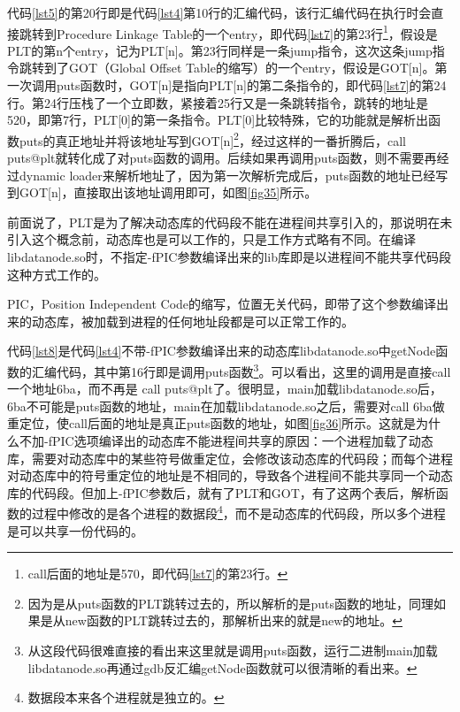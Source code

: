 \documentclass[a4paper, 12pt, titlepage]{article}
\newlength{\du}
\begin{document}
代码\ref{lst5}的第20行即是代码\ref{lst4}第10行的汇编代码，该行汇编代码在执行时会直接跳转到Procedure Linkage Table的一个entry，即代码\ref{lst7}的第23行\footnote{call后面的地址是570，即代码\ref{lst7}的第23行。}，假设是PLT的第n个entry，记为PLT[n]。第23行同样是一条jump指令，这次这条jump指令跳转到了GOT（Global Offset Table的缩写）的一个entry，假设是GOT[n]。第一次调用puts函数时，GOT[n]是指向PLT[n]的第二条指令的，即代码\ref{lst7}的第24行。第24行压栈了一个立即数，紧接着25行又是一条跳转指令，跳转的地址是520，即第7行，PLT[0]的第一条指令。PLT[0]比较特殊，它的功能就是解析出函数puts的真正地址并将该地址写到GOT[n]\footnote{因为是从puts函数的PLT跳转过去的，所以解析的是puts函数的地址，同理如果是从new函数的PLT跳转过去的，那解析出来的就是new的地址。}，经过这样的一番折腾后，call puts@plt就转化成了对puts函数的调用。后续如果再调用puts函数，则不需要再经过dynamic loader来解析地址了，因为第一次解析完成后，puts函数的地址已经写到GOT[n]，直接取出该地址调用即可，如图\ref{fig35}所示。
\begin{spacing}{1.0}
  Assembler}]{list/plt.s}
\end{spacing}



前面说了，PLT是为了解决动态库的代码段不能在进程间共享引入的，那说明在未引入这个概念前，动态库也是可以工作的，只是工作方式略有不同。在编译libdatanode.so时，不指定-fPIC参数编译出来的lib库即是以进程间不能共享代码段这种方式工作的。

PIC，Position Independent Code的缩写，位置无关代码，即带了这个参数编译出来的动态库，被加载到进程的任何地址段都是可以正常工作的。

代码\ref{lst8}是代码\ref{lst4}不带-fPIC参数编译出来的动态库libdatanode.so中getNode函数的汇编代码，其中第16行即是调用puts函数\footnote{从这段代码很难直接的看出来这里就是调用puts函数，运行二进制main加载libdatanode.so再通过gdb反汇编getNode函数就可以很清晰的看出来。}。可以看出，这里的调用是直接call一个地址6ba，而不再是 call puts@plt了。很明显，main加载libdatanode.so后，6ba不可能是puts函数的地址，main在加载libdatanode.so之后，需要对call 6ba做重定位，使call后面的地址是真正puts函数的地址，如图\ref{fig36}所示。这就是为什么不加-fPIC选项编译出的动态库不能进程间共享的原因：一个进程加载了动态库，需要对动态库中的某些符号做重定位，会修改该动态库的代码段；而每个进程对动态库中的符号重定位的地址是不相同的，导致各个进程间不能共享同一个动态库的代码段。但加上-fPIC参数后，就有了PLT和GOT，有了这两个表后，解析函数的过程中修改的是各个进程的数据段\footnote{数据段本来各个进程就是独立的。}，而不是动态库的代码段，所以多个进程是可以共享一份代码的。
\begin{spacing}{1.0}
  Assembler}]{list/load_time_relocation.s}
\end{spacing}
\end{document}
